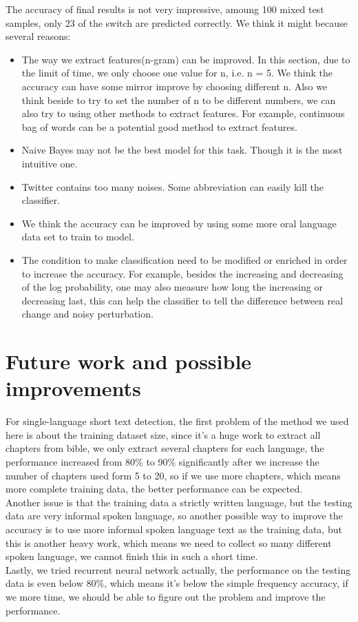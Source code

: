 \documentclass[11pt]{article}
\begin{document}
The accuracy of final results is not very impressive, amoung 100 mixed test samples, only 23 of the switch are predicted correctly. We think it might because several reasons:
\begin{itemize}
\item The way we extract features(n-gram) can be improved. In this section, due to the limit of time, we only choose one value for n, i.e. n = 5. We think the accuracy can have some mirror improve by choosing different n. Also we think beside to try to set the number of n to be different numbers, we can also try to using other methods to extract features. For example, continuous bag of words can be a potential good method to extract features. 
\item Naive Bayes may not be the best model for this task. Though it is the most intuitive one. 
\item Twitter contains too many noises. Some abbreviation can easily kill the classifier.
\item We think the accuracy can be improved by using some more oral language data set to train to model.
\item The condition to make classification need to be modified or enriched in order to increase the accuracy. For example, besides the increasing and decreasing of the log probability, one may also measure how long the increasing or decreasing last, this can help the classifier to tell the difference between real change and noisy perturbation.
\end{itemize}




\section{Future work and possible improvements}
For single-language short text detection,
the first problem of the method we used here is about the training dataset size, since it's a huge work to extract all chapters from bible, we only extract several chapters for each language, the performance increased from 80\% to 90\% significantly after we increase the number of chapters used form 5 to 20, so if we use more chapters, which means more complete training data, the better performance can be expected.\\
Another issue is that the training data a strictly written language, but the testing data are very informal spoken language, so another possible way to improve the accuracy is to use more informal spoken language text as the training data, but this is another heavy work, which means we need to collect so many different spoken language, we cannot finish this in such a short time.\\
Lastly, we tried recurrent neural network actually, the performance on the testing data is even below 80\%, which means it's below the simple frequency accuracy, if we more time, we should be able to figure out the problem and improve the performance.
\end{document}
